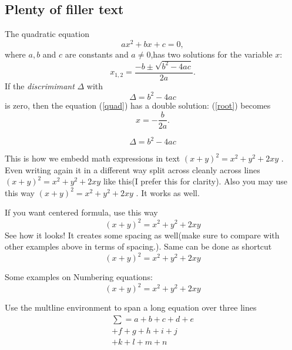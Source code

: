\documentclass[a4paper,12pt]{book}
\begin{document}
\subsection[subsection name]{Plenty of filler text}
\blindtext[3]


The quadratic equation
\begin{equation}\label{quad}
 ax^2 + bx + c = 0,
\end{equation}
where \( a, b \) and \( c \) are constants and \( a \neq 0 \),has two solutions for the variable \( x \):
\begin{equation}\label{root}
 x_{1,2} = \frac{-b \pm \sqrt{b^2-4ac}}{2a}.
\end{equation}
If the \emph{discrimimant} \( \Delta \) with
\[
 \Delta = b^2 - 4ac
\]
is zero, then the equation (\ref{quad}) has a double solution:
(\ref{root}) becomes
\[
 x = - \frac{b}{2a}.
\]

$$
 \Delta = b^2 - 4ac
$$


This is how we embedd math expressions in text \begin{math} (x+y)^2 = x^2 + y^2 + 2xy \end{math} . Even writing again it in a different way split across cleanly across lines
\begin{math}
  (x+y)^2 = x^2 + y^2 + 2xy
\end{math}
like this(I prefer this for clarity). Also you may use this way
\(
  (x+y)^2 = x^2 + y^2 + 2xy
\)
 . It works as well.


If you want centered formula, use this way
\begin{displaymath}
  (x+y)^2 = x^2 + y^2 + 2xy
\end{displaymath} See how it looks!  It creates some spacing as well(make sure to compare with other examples above in terms of spacing.). Same can be done as shortcut
\[
  (x+y)^2 = x^2 + y^2 + 2xy
\]


Some examples on Numbering equations:
\begin{equation} \label{key}
 (x+y)^2 = x^2 + y^2 + 2xy
\end{equation}

Use the multline environment to span a long equation over three lines
\begin{multline}
\sum = a + b + c + d + e \\
        + f + g + h + i + j \\
        + k + l + m + n
\end{multline}
\end{document}
